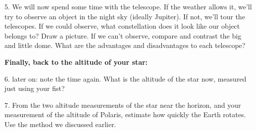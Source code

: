 \documentclass[10pt]{article}%
\begin{document}
\begin{flushleft}
\vspace{0.1in}

5. We will now spend some time with the telescope. If the weather allows it, we'll try to observe an object in the night sky (ideally Jupiter). If not, we'll tour the telescopes. If we could observe, what constellation does it look like our object belongs to? Draw a picture. If we can't observe, compare and contrast the big and little dome. What are the advantages and disadvantages to each telescope?


\vspace{0.1in}

\vspace{.1in}
\textbf{Finally, back to the altitude of your star:}

6. later on: note the time again. What is the altitude of the star now, measured just using your fist?

\vspace{0.1in}

7. From the two altitude measurements of the star near the horizon, and your
measurement of the altitude of Polaris, estimate how quickly the Earth rotates.
Use the method we discussed earlier.

\end{flushleft}
\end{document}

